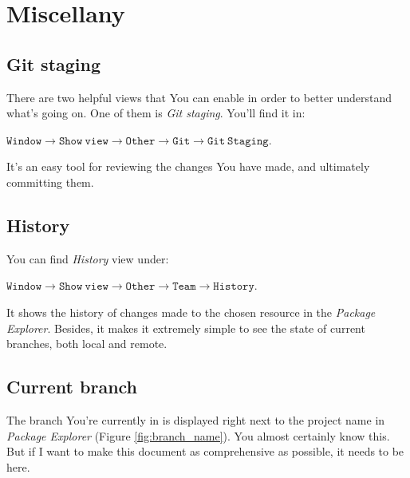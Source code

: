 \documentclass{article}
\begin{document}
\section{Miscellany}

\subsection{Git staging}
\label{sec:git_staging}

There are two helpful views that You can enable in order to better understand what's going on. One of them is \textit{Git staging}. You'll find it in: \newline

$\mathtt{Window\rightarrow Show\ view \rightarrow Other \rightarrow Git \rightarrow Git\ Staging}$.\newline

It's an easy tool for reviewing the changes You have made, and ultimately committing them.

\subsection{History}
\label{sec:git_history}

You can find \textit{History} view under: \newline

$\mathtt{Window \rightarrow Show\ view \rightarrow Other \rightarrow Team \rightarrow History}$.\newline

It shows the history of changes made to the chosen resource in the \textit{Package Explorer}. Besides, it makes it extremely simple to see the state of current branches, both local and remote.

\subsection{Current branch}

The branch You're currently in is displayed right next to the project name in \textit{Package Explorer} (Figure  \ref{fig:branch_name}). You almost certainly know this. But if I want to make this document as comprehensive as possible, it needs to be here.
\end{document}
